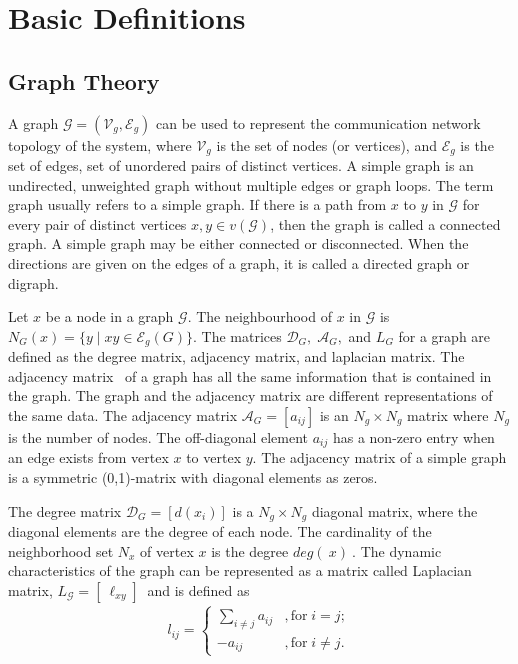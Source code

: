 \chapter{Basic Definitions}
\section{Graph Theory}\label{graph}
A graph $\mathcal{G}= (\mathcal{V}_g, \mathcal{E}_g)$ can be used to represent the communication network topology of the system, where $\mathcal{V}_g$ is the set of nodes (or vertices), and $\mathcal{E}_g$ is the set of edges, set of unordered pairs of distinct vertices. A simple graph is an undirected, unweighted graph without multiple edges or graph loops. The term graph usually refers to a simple graph. If there is a path from $x$ to $y$ in $\mathcal{G}$ for every pair of distinct vertices $x, y \in v(\mathcal{G})$, then the graph is called a connected graph. A simple graph may be either connected or disconnected. When the directions are given on the edges of a graph, it is called a directed graph or digraph. 

Let $x$ be a node in a graph $\mathcal{G}$. The neighbourhood of $x$ in $\mathcal{G}$ is $N_G(x) = \{y \; |\; xy \in \mathcal{E}_g(G)\}$. The matrices $\mathcal{D}_G, \; \mathcal{A}_G,$ and $L_G$  for a graph are defined as the degree matrix, adjacency matrix, and laplacian matrix. The adjacency matrix~\cite{mesbahi2010graph} of a graph has all the same information that is contained in the graph. The graph and the adjacency matrix are different representations of the same data. The adjacency matrix $\mathcal{A}_G =[a_{ij}]$ is an $N_g \times N_g$ matrix where  $N_g$ is the number of nodes. The off-diagonal element $a_{ij}$ has a non-zero entry when an edge exists from vertex $x$ to vertex $y$. The adjacency matrix of a simple graph is a symmetric (0,1)-matrix with diagonal elements as zeros. 

The degree matrix  $\mathcal{D}_G=[d(x_i)]$ is a $N_g \times N_g$ diagonal matrix, where the diagonal elements are the degree of each node. The cardinality of the neighborhood set $N_x$ of vertex $x$ is the degree $ deg (\ \! x )\ $. The dynamic characteristics of the graph can be represented as a matrix called Laplacian matrix, $L_\mathcal{G} = [\ \ell_{xy}]\ $ and is defined as
\begin{align}\label{1}
l_{ij}=
\begin{cases}
\sum \limits_{i \neq j} a_{ij}&,\text{for} \; i = j;\\   
-a_{ij}&,\text{for} \; i \neq j.
\end{cases}
\end{align}

